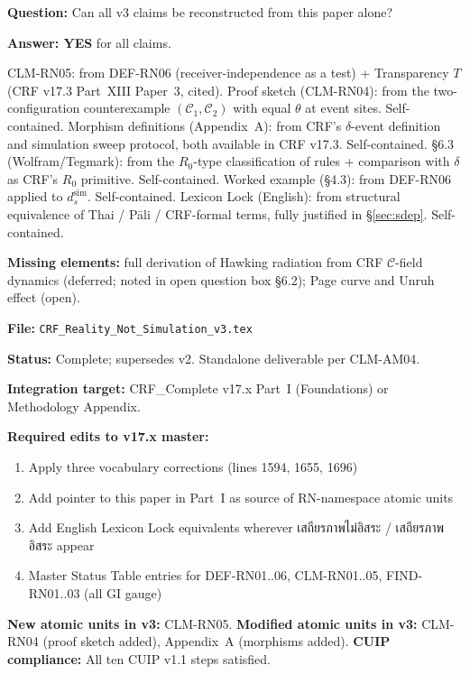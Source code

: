 \documentclass[12pt, a4paper]{article}
\begin{document}
\begin{formalbox}[title={Reconstruction Test (No-Loss Mode, v3)}]
\textbf{Question:} Can all v3 claims be reconstructed from this
paper alone?

\textbf{Answer: YES} for all claims.

CLM-RN05: from DEF-RN06 (receiver-independence as a test) +
Transparency $T$ (CRF v17.3 Part~XIII Paper~3, cited).
Proof sketch (CLM-RN04): from the two-configuration counterexample
$(\mathcal{C}_1, \mathcal{C}_2)$ with equal $\theta$ at event
sites. Self-contained.
Morphism definitions (Appendix~A): from CRF's $\delta$-event
definition and simulation sweep protocol, both available in
CRF v17.3. Self-contained.
\S6.3 (Wolfram/Tegmark): from the $R_0$-type classification of
rules + comparison with $\delta$ as CRF's $R_0$ primitive.
Self-contained.
Worked example (\S4.3): from DEF-RN06 applied to $d_s^{\mathrm{sim}}$.
Self-contained.
Lexicon Lock (English): from structural equivalence of Thai /
Pāli / CRF-formal terms, fully justified in \S\ref{sec:sdep}.
Self-contained.

\textbf{Missing elements:} full derivation of Hawking radiation
from CRF $\mathcal{C}$-field dynamics (deferred; noted in open
question box \S6.2); Page curve and Unruh effect (open).
\end{formalbox}

\begin{formalbox}[title={Integration Queue Entry (Slot 4c, v3 update)}]
\textbf{File:} \texttt{CRF\_Reality\_Not\_Simulation\_v3.tex}

\textbf{Status:} Complete; supersedes v2. Standalone deliverable
per CLM-AM04.

\textbf{Integration target:} CRF\_Complete v17.x Part~I
(Foundations) or Methodology Appendix.

\textbf{Required edits to v17.x master:}
\begin{enumerate}[leftmargin=*,noitemsep]
\item Apply three vocabulary corrections (lines 1594, 1655, 1696)
\item Add pointer to this paper in Part~I as source of RN-namespace
  atomic units
\item Add English Lexicon Lock equivalents wherever
  เสถียรภาพไม่อิสระ / เสถียรภาพอิสระ appear
\item Master Status Table entries for DEF-RN01..06, CLM-RN01..05,
  FIND-RN01..03 (all GI gauge)
\end{enumerate}

\textbf{New atomic units in v3:} CLM-RN05.
\textbf{Modified atomic units in v3:} CLM-RN04 (proof sketch added),
  Appendix~A (morphisms added).
\textbf{CUIP compliance:} All ten CUIP v1.1 steps satisfied.
\end{formalbox}
\end{document}
